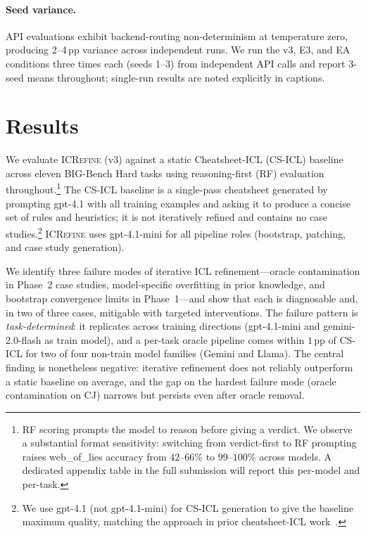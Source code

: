 \documentclass{article}
\begin{document}
\paragraph{Seed variance.}
API evaluations exhibit backend-routing non-determinism at temperature zero, producing 2--4\,pp
variance across independent runs.
We run the v3, E3, and EA conditions three times each (seeds 1--3) from independent API calls
and report 3-seed means throughout; single-run results are noted explicitly in captions.

\section{Results}
\label{sec:results}

We evaluate \textsc{ICRefine} (v3) against a static Cheatsheet-ICL (CS-ICL) baseline across
eleven BIG-Bench Hard tasks using reasoning-first (RF) evaluation throughout.\footnote{RF
scoring prompts the model to reason before giving a verdict. We observe a substantial
format sensitivity: switching from verdict-first to RF prompting raises web\_of\_lies
accuracy from $42$--$66\%$ to $99$--$100\%$ across models. A dedicated appendix table
in the full submission will report this per-model and per-task.}
The CS-ICL baseline is a single-pass cheatsheet generated by prompting gpt-4.1 with all
training examples and asking it to produce a concise set of rules and heuristics; it is not
iteratively refined and contains no case studies.\footnote{We use gpt-4.1 (not gpt-4.1-mini)
for CS-ICL generation to give the baseline maximum quality, matching the approach in prior
cheatsheet-ICL work~\cite{csicl2024}.}
\textsc{ICRefine} uses gpt-4.1-mini for all pipeline roles (bootstrap, patching, and case
study generation).

We identify three failure modes of iterative ICL refinement---oracle contamination in
Phase~2 case studies, model-specific overfitting in prior knowledge, and bootstrap
convergence limits in Phase~1---and show that each is diagnosable and, in two of three cases,
mitigable with targeted interventions.
The failure pattern is \emph{task-determined}: it replicates across training directions
(gpt-4.1-mini and gemini-2.0-flash as train model), and a per-task oracle pipeline
comes within $1$\,pp of CS-ICL for two of four non-train model families (Gemini and Llama).
The central finding is nonetheless negative: iterative refinement does not reliably
outperform a static baseline on average, and the gap on the hardest failure mode
(oracle contamination on CJ) narrows but persists even after oracle removal.
\end{document}
